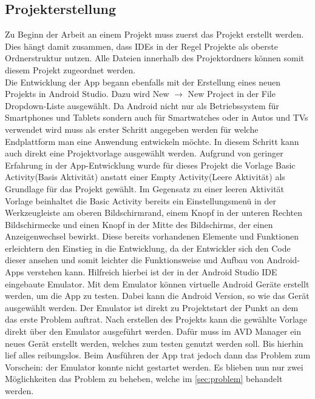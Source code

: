 \subsection{Projekterstellung}\label{subsec:projekterstellung}
Zu Beginn der Arbeit an einem Projekt muss zuerst das Projekt erstellt werden. Dies hängt damit zusammen, dass \acp{IDE} in der Regel Projekte als oberste Ordnerstruktur nutzen. Alle Dateien innerhalb des Projektordners können somit diesem Projekt zugeordnet werden.\\
Die Entwicklung der App begann ebenfalls mit der Erstellung eines neuen Projekts in Android Studio. Dazu wird \glqq New $\rightarrow$ New Project\grqq{} in der File Dropdown-Liste ausgewählt. Da Android nicht nur als Betriebssystem für Smartphones und Tablets sondern auch für Smartwatches oder in Autos und TVs verwendet wird muss als erster Schritt angegeben werden für welche Endplattform man eine Anwendung entwickeln möchte. In diesem Schritt kann auch direkt eine Projektvorlage ausgewählt werden. Aufgrund von geringer Erfahrung in der App-Entwicklung wurde für dieses Projekt die Vorlage \glqq Basic Activity\grqq (Basis Aktivität) anstatt einer \glqq Empty Activity\grqq (Leere Aktivität) als Grundlage für das Projekt gewählt. Im Gegensatz zu einer leeren Aktivität Vorlage beinhaltet die Basic Activity bereits ein Einstellungsmenü in der Werkzeugleiste am oberen Bildschirmrand, einem Knopf in der unteren Rechten Bildschirmecke und einen Knopf in der Mitte des Bildschirms, der einen Anzeigenwechsel bewirkt. Diese bereits vorhandenen Elemente und Funktionen erleichtern den Einstieg in die Entwicklung, da der Entwickler sich den Code dieser ansehen und somit leichter die Funktionsweise und Aufbau von Android-Apps verstehen kann. Hilfreich hierbei ist der in der Android Studio \ac{IDE} eingebaute Emulator. Mit dem Emulator können virtuelle Android Geräte erstellt werden, um die App zu testen. Dabei kann die Android Version, so wie das Gerät ausgewählt werden. Der Emulator ist direkt zu Projektstart der Punkt an dem das erste Problem auftrat. Nach erstellen des Projekts kann die gewählte Vorlage direkt über den Emulator ausgeführt werden. Dafür muss im \ac{AVD} Manager ein neues Gerät erstellt werden, welches zum testen genutzt werden soll. Bis hierhin lief alles reibungslos. Beim Ausführen der App trat jedoch dann das Problem zum Vorschein: der Emulator konnte nicht gestartet werden.
Es blieben nun nur zwei Möglichkeiten das Problem zu beheben, welche im \autoref{sec:problem}  behandelt werden.\\

